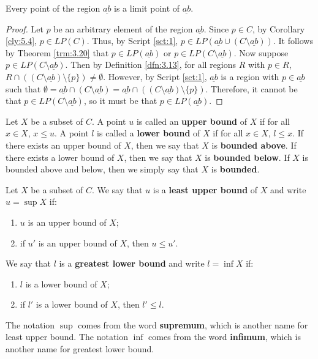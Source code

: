 \documentclass[../main.tex]{subfiles}
\begin{document}
\begin{corollary}\label{cly:5.5}
    Every point of the region $\underline{ab}$ is a limit point of $\underline{ab}$.
    \begin{proof}
        Let $p$ be an arbitrary element of the region $\underline{ab}$. Since $p\in C$, by Corollary \ref{cly:5.4}, $p\in LP(C)$. Thus, by Script \ref{sct:1}, $p\in LP(\underline{ab}\cup(C\setminus\underline{ab}))$. It follows by Theorem \ref{trm:3.20} that $p\in LP(\underline{ab})$ or $p\in LP(C\setminus\underline{ab})$. Now suppose $p\in LP(C\setminus\underline{ab})$. Then by Definition \ref{dfn:3.13}, for all regions $R$ with $p\in R$, $R\cap((C\setminus\underline{ab})\setminus\{p\})\neq\emptyset$. However, by Script \ref{sct:1}, $\underline{ab}$ is a region with $p\in\underline{ab}$ such that $\emptyset=\underline{ab}\cap(C\setminus\underline{ab})=\underline{ab}\cap((C\setminus\underline{ab})\setminus\{p\})$. Therefore, it cannot be that $p\in LP(C\setminus\underline{ab})$, so it must be that $p\in LP(\underline{ab})$.
    \end{proof}
\end{corollary}

\begin{definition}\label{dfn:5.6}
    Let $X$ be a subset of $C$. A point $u$ is called an \textbf{upper bound} of $X$ if for all $x\in X$, $x\leq u$. A point $l$ is called a \textbf{lower bound} of $X$ if for all $x\in X$, $l\leq x$. If there exists an upper bound of $X$, then we say that $X$ is \textbf{bounded above}. If there exists a lower bound of $X$, then we say that $X$ is \textbf{bounded below}. If $X$ is bounded above and below, then we simply say that $X$ is \textbf{bounded}.
\end{definition}

\begin{definition}\label{dfn:5.7}
    Let $X$ be a subset of $C$. We say that $u$ is a \textbf{least upper bound} of $X$ and write $u=\sup X$ if:
    \begin{enumerate}
        \item $u$ is an upper bound of $X$;
        \item if $u'$ is an upper bound of $X$, then $u\leq u'$.
    \end{enumerate}
    We say that $l$ is a \textbf{greatest lower bound} and write $l=\inf X$ if:
    \begin{enumerate}
        \item $l$ is a lower bound of $X$;
        \item if $l'$ is a lower bound of $X$, then $l'\leq l$.
    \end{enumerate}
    The notation $\sup$ comes from the word \textbf{supremum}, which is another name for least upper bound. The notation $\inf$ comes from the word \textbf{infimum}, which is another name for greatest lower bound.
\end{definition}
\end{document}
